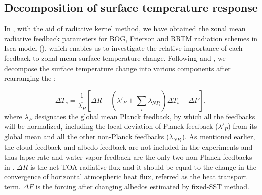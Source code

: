 \subsection{Decomposition of surface temperature response}
\label{sec:climate_feedbacks_temp_decomp}


In , with the aid of radiative kernel method, we have obtained the zonal mean radiative feedback parameters for BOG, Frierson and RRTM radiation schemes in Isca model (), which enables us to investigate the relative importance of each feedback to zonal mean surface temperature change. Following \cite{Feldl2013} and \cite{Kim2018}, we decompose the surface temperature change into various components after rearranging the :


\begin{equation}
	\Delta T_s = \frac{1}{\overline{\lambda_P}}\left[\Delta R -\left(\lambda'_P+\sum_{i}\lambda_{NP_i}\right)\Delta T_s-\Delta F\right],
	\label{eq:decomp_Ts}
\end{equation}
where $\overline{\lambda_P}$ designates the global mean Planck feedback, by which all the feedbacks will be normalized, including the local deviation of Planck feedback ($\lambda'_P$) from its global mean and all the other non-Planck feedbacks ($\lambda_{NP_i}$). As mentioned earlier, the cloud feedback and albedo feedback are not included in the experiments and thus lapse rate and water vapor feedback are the only two non-Planck feedbacks in . $\Delta R$ is the net TOA radiative flux and it should be equal to the change in the convergence of horizontal atmospheric heat flux, referred as the heat transport term. $\Delta F$ is the forcing after changing albedos estimated by fixed-SST method.


